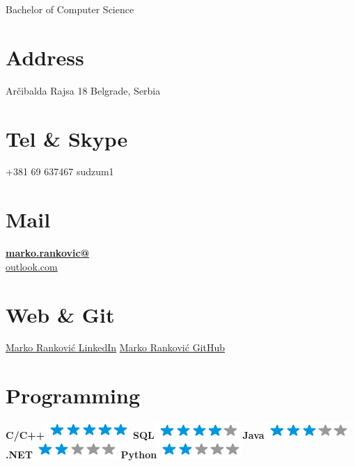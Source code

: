\documentclass[]{rankovic-cv}
\begin{document}
      {Bachelor of Computer Science}
      



\begin{aside}
  \section{Address}
    Arčibalda Rajsa 18
    Belgrade, Serbia
    ~
  \section{Tel \& Skype}
    +381 69 637467
    sudzum1
    ~
  \section{Mail}
    \href{mailto:marko.rankovic@outlook.com}{\textbf{marko.rankovic@}\\outlook.com}
    ~
  \section{Web \& Git}
    \href{https://www.linkedin.com/in/marko-rankovic-055034b0}{Marko Ranković LinkedIn}
    \href{https://github.com/marko-rankovic}{Marko Ranković GitHub}
    ~
  \section{Programming}
    \textbf{C/C++}\includegraphics[scale=0.40]{img/5stars.png}
    \textbf{SQL}\includegraphics[scale=0.40]{img/4stars.png}
    \textbf{Java}\includegraphics[scale=0.40]{img/3stars.png}
    \textbf{.NET}\includegraphics[scale=0.40]{img/2stars.png}
    \textbf{Python}\includegraphics[scale=0.40]{img/2stars.png}
    ~

\end{aside}
\end{document}
